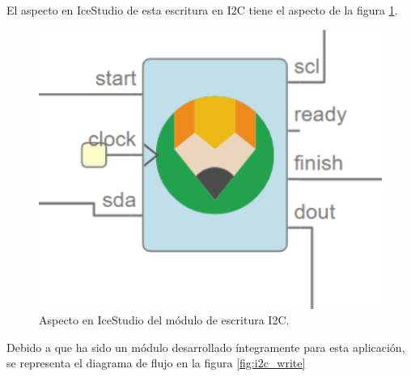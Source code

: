 El aspecto en IceStudio de esta escritura en I2C tiene el aspecto de la figura \ref{fig:I2C_write}.
\begin{figure}[H]
	\center
	\includegraphics[scale=0.4, angle=0]{imagenes/Cuadricoptero_vision/I2C_write.PNG}
	\caption{Aspecto en IceStudio del módulo de escritura I2C.}
	\label{fig:I2C_write}
\end{figure}

Debido a que ha sido un módulo desarrollado íntegramente para esta aplicación, se representa el diagrama de flujo en la figura \ref{fig:i2c_write}

